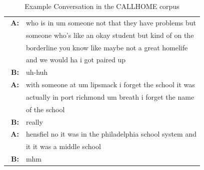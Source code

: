 \documentclass[letterpaper]{article}
\begin{document}
\begin{table}[t!]
    \centering
    \small
    \caption{\small Example Conversation in the CALLHOME corpus}
    \begin{tabular}{rl}
    	\hline
      \hline
        \textbf{A:} & who is in um someone not that they have problems but\\
        		    & someone who's like an okay student but kind of on the\\
        			& borderline you know like maybe not a great homelife\\
        			& and we would ha i got paired up\\
		\textbf{B:} & uh-huh \\
\textbf{A:} & with someone at um lipsmack i forget the school it was\\
			& actually in port richmond um breath i forget the name\\
			& of the school\\\
\textbf{B:} & really\\
\textbf{A:} & hensfiel no it was in the philadelphia school system and\\ 
			& it it was a middle school\\
\textbf{B:} & mhm\\
      \hline
    \end{tabular}
    \label{table:phone_data}
\end{table}
\end{document}
